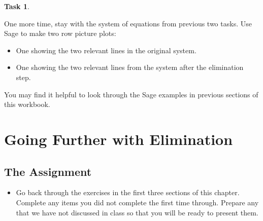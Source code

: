 \documentclass[10pt,]{book}
\theoremstyle{plain}
\theoremstyle{definition}
\numberwithin{equation}{section}
\newtheorem{task}{Task}[chapter]
\begin{document}
\begin{task}
\label{task-54}

      One more time, stay with the system of equations from previous two tasks.
      Use Sage to make two row picture plots:
\begin{itemize}
\item{} One showing the two relevant lines in the original system.\item{} One showing the two relevant lines from the system after the elimination step.\end{itemize}
\par

      You may find it helpful to look through the Sage examples in previous sections
      of this workbook.
\end{task}
\clearpage
\typeout{************************************************}
\typeout{************************************************}
\section[Going Further with Elimination]{Going Further with Elimination}\label{lin-eq-going-further-1}
\typeout{************************************************}
\typeout{************************************************}
\subsection[The Assignment]{The Assignment}\label{subsection-34}
\begin{itemize}
\item{}
        Go back through the exercises in the first three sections of this chapter.
        Complete any items you
        did not complete the first time through. Prepare any that we have not
        discussed in class so that you will be ready to present them.
      \end{itemize}
\typeout{************************************************}
\typeout{************************************************}
\end{document}
